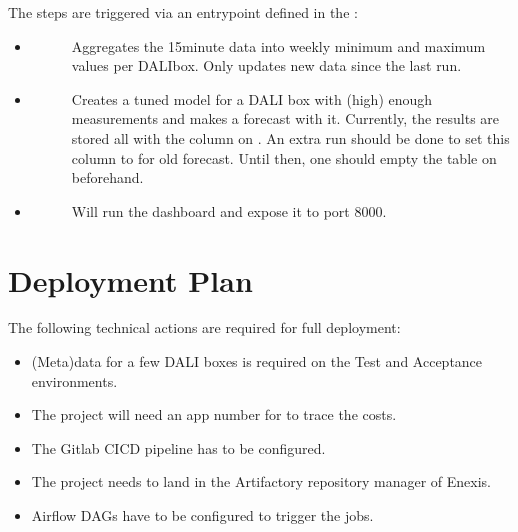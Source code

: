 \documentclass[letterpaper,10pt,english]{sphinxmanual}
\begin{document}
The steps are triggered via an entrypoint defined in the :
\begin{itemize}
\item {} \begin{description}
\item[{}] \leavevmode
Aggregates the 15\sphinxhyphen{}minute data into weekly minimum and maximum values per DALI\sphinxhyphen{}box.
Only updates new data since the last run.

\end{description}

\item {} \begin{description}
\item[{}] \leavevmode
Creates a tuned model for a DALI box with (high) enough measurements and makes a forecast with it.
Currently, the results are stored all with the  column on .
An extra run should be done to set this column to  for old forecast.
Until then, one should empty the table on beforehand.

\end{description}

\item {} \begin{description}
\item[{}] \leavevmode
Will run the dashboard and expose it to port 8000.

\end{description}

\end{itemize}


\section{Deployment Plan}
\label{\detokenize{deployment:deployment-plan}}
The following technical actions are required for full deployment:
\begin{itemize}
\item {} 
(Meta)data for a few DALI boxes is required on the Test and Acceptance environments.

\item {} 
The project will need an app number for to trace the costs.

\item {} 
The Gitlab CICD pipeline has to be configured.

\item {} 
The project needs to land in the Artifactory repository manager of Enexis.

\item {} 
Airflow DAGs have to be configured to trigger the jobs.

\end{itemize}
\end{document}
